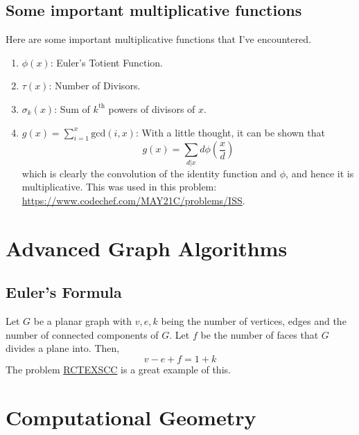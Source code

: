 \documentclass[12pt,a4paper]{amsart}
\numberwithin{equation}{section}
\theoremstyle{definition}
\begin{document}
\subsection{Some important multiplicative functions} Here are some important multiplicative functions that I've encountered.

\begin{enumerate}
    \item $\phi(x)$: Euler's Totient Function. 
    \item $\tau(x)$: Number of Divisors.
    \item $\sigma_k(x)$: Sum of $k^\text{th}$ powers of divisors of $x$. 
    \item $g(x) = \sum_{i = 1}^x \text{gcd}(i , x)$: With a little thought, it can be shown that 
    $$g(x) = \sum_{d | x}d\phi\left(\dfrac{x}{d}\right)$$
    which is clearly the convolution of the identity function and $\phi$, and hence it is multiplicative. This was used in this problem: \url{https://www.codechef.com/MAY21C/problems/ISS}.
\end{enumerate}

\section{Advanced Graph Algorithms}

\subsection{Euler's Formula} Let $G$ be a planar graph with $v,e,k$ being the number of vertices, edges and the number of connected components of $G$. Let $f$ be the number of faces that $G$ divides a plane into. Then, 
$$v - e + f = 1 + k$$
The problem \href{https://discuss.codechef.com/t/rctexscc-editorial/83502}{RCTEXSCC} is a great example of this. 

\section{Computational Geometry} 
\end{document}
